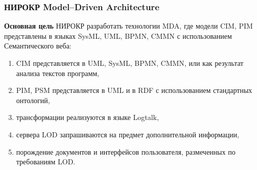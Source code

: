 \documentclass[handout]{beamer}
\begin{document}
\begin{frame}
  \frametitle{НИРОКР Model--Driven Architecture}
  \textbf{Основная цель} НИРОКР разработать технологии MDA, где модели CIM, PIM представлены в языках SysML, UML, BPMN, CMMN с использованием Семантического веба:
  \begin{enumerate}
  \item CIM представляется в UML, SysML, BPMN, CMMN, или как результат анализа текстов программ,
  \item PIM, PSM представляется в UML и в RDF с использованием стандартных онтологий,
  \item трансформации реализуются в языке Logtalk,
  \item сервера LOD запрашиваются на предмет дополнительной информации,
  \item порождение документов и интерфейсов пользователя, размеченных по требованиям LOD.
  \end{enumerate}
\end{frame}


\end{document}
